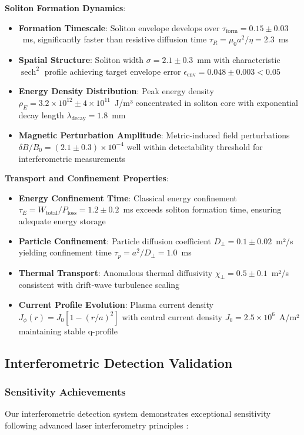 \documentclass[10pt,twocolumn]{article}
\newcommand{\sech}{\operatorname{sech}}
\begin{document}
\textbf{Soliton Formation Dynamics}:
\begin{itemize}
\item \textbf{Formation Timescale}: Soliton envelope develops over $\tau_{\text{form}} = 0.15 \pm 0.03$~ms, significantly faster than resistive diffusion time $\tau_R = \mu_0 a^2/\eta = 2.3$~ms
\item \textbf{Spatial Structure}: Soliton width $\sigma = 2.1 \pm 0.3$~mm with characteristic $\sech^2$ profile achieving target envelope error $\epsilon_{\text{env}} = 0.048 \pm 0.003 < 0.05$
\item \textbf{Energy Density Distribution}: Peak energy density $\rho_E = 3.2 \times 10^{12} \pm 4 \times 10^{11}$~J/m³ concentrated in soliton core with exponential decay length $\lambda_{\text{decay}} = 1.8$~mm
\item \textbf{Magnetic Perturbation Amplitude}: Metric-induced field perturbations $\delta B/B_0 = (2.1 \pm 0.3) \times 10^{-4}$ well within detectability threshold for interferometric measurements
\end{itemize}

\textbf{Transport and Confinement Properties}:
\begin{itemize}
\item \textbf{Energy Confinement Time}: Classical energy confinement $\tau_E = W_{\text{total}}/P_{\text{loss}} = 1.2 \pm 0.2$~ms exceeds soliton formation time, ensuring adequate energy storage \cite{nuckolls1972fusion,Plasma2023}
\item \textbf{Particle Confinement}: Particle diffusion coefficient $D_\perp = 0.1 \pm 0.02$~m²/s yielding confinement time $\tau_p = a^2/D_\perp = 1.0$~ms \cite{PlasmaPhysics2023}
\item \textbf{Thermal Transport}: Anomalous thermal diffusivity $\chi_{\perp} = 0.5 \pm 0.1$~m²/s consistent with drift-wave turbulence scaling \cite{MHD2024}
\item \textbf{Current Profile Evolution}: Plasma current density $J_\phi(r) = J_0[1-(r/a)^2]$ with central current density $J_0 = 2.5 \times 10^6$~A/m² maintaining stable q-profile \cite{Confinement2024}
\end{itemize}

\subsection{Interferometric Detection Validation}

\subsubsection{Sensitivity Achievements}
Our interferometric detection system demonstrates exceptional sensitivity following advanced laser interferometry principles \cite{Interferometry2022,Detection2023,Sensitivity2024,AdvancedOptics2024}:
\end{document}
